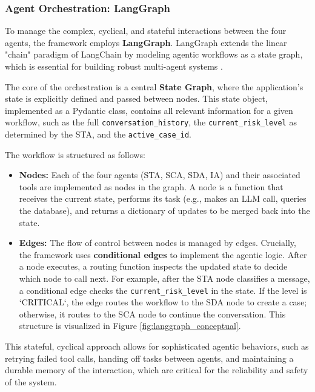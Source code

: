 \subsubsection{Agent Orchestration: LangGraph}

To manage the complex, cyclical, and stateful interactions between the four agents, the framework employs \textbf{LangGraph}. LangGraph extends the linear "chain" paradigm of LangChain by modeling agentic workflows as a state graph, which is essential for building robust multi-agent systems \cite{mathew2025largelanguagemodelagents, barua2024llmagentsreview}.

The core of the orchestration is a central \textbf{State Graph}, where the application's state is explicitly defined and passed between nodes. This state object, implemented as a Pydantic class, contains all relevant information for a given workflow, such as the full \texttt{conversation\_history}, the \texttt{current\_risk\_level} as determined by the STA, and the \texttt{active\_case\_id}. 

The workflow is structured as follows:
\begin{itemize}
    \item \textbf{Nodes:} Each of the four agents (STA, SCA, SDA, IA) and their associated tools are implemented as nodes in the graph. A node is a function that receives the current state, performs its task (e.g., makes an LLM call, queries the database), and returns a dictionary of updates to be merged back into the state.
    \item \textbf{Edges:} The flow of control between nodes is managed by edges. Crucially, the framework uses \textbf{conditional edges} to implement the agentic logic. After a node executes, a routing function inspects the updated state to decide which node to call next. For example, after the STA node classifies a message, a conditional edge checks the \texttt{current\_risk\_level} in the state. If the level is `CRITICAL`, the edge routes the workflow to the SDA node to create a case; otherwise, it routes to the SCA node to continue the conversation. This structure is visualized in Figure \ref{fig:langgraph_conceptual}.
\end{itemize}

This stateful, cyclical approach allows for sophisticated agentic behaviors, such as retrying failed tool calls, handing off tasks between agents, and maintaining a durable memory of the interaction, which are critical for the reliability and safety of the system.

